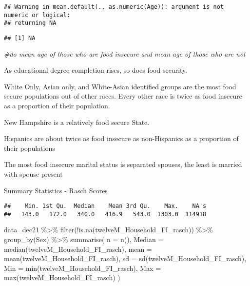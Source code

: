 \documentclass[
]{article}
\newenvironment{Shaded}{\begin{snugshade}}{\end{snugshade}}
\newcommand{\AttributeTok}[1]{\textcolor[rgb]{0.77,0.63,0.00}{#1}}
\newcommand{\CommentTok}[1]{\textcolor[rgb]{0.56,0.35,0.01}{\textit{#1}}}
\newcommand{\FunctionTok}[1]{\textcolor[rgb]{0.00,0.00,0.00}{#1}}
\newcommand{\NormalTok}[1]{#1}
\newcommand{\SpecialCharTok}[1]{\textcolor[rgb]{0.00,0.00,0.00}{#1}}
\begin{document}
\begin{verbatim}
## Warning in mean.default(., as.numeric(Age)): argument is not numeric or logical:
## returning NA
\end{verbatim}

\begin{verbatim}
## [1] NA
\end{verbatim}

\begin{Shaded}
\begin{Highlighting}[]
\CommentTok{\#do mean age of those who are food insecure and mean age of those who are not}
\end{Highlighting}
\end{Shaded}

As educational degree completion rises, so does food security.

White Only, Asian only, and White-Asian identified groups are the most
food secure populations out of other races. Every other race is twice as
food insecure as a proportion of their population.

New Hampshire is a relatively food secure State.

Hispanics are about twice as food insecure as non-Hispanics as a
proportion of their populations

The most food insecure marital status is separated spouses, the least is
married with spouse present

Summary Statistics - Rasch Scores

\begin{Shaded}
\end{Shaded}

\begin{verbatim}
##    Min. 1st Qu.  Median    Mean 3rd Qu.    Max.    NA's 
##   143.0   172.0   340.0   416.9   543.0  1303.0  114918
\end{verbatim}

\begin{Shaded}
\begin{Highlighting}[]
\NormalTok{data\_dec21 }\SpecialCharTok{\%\textgreater{}\%} \FunctionTok{filter}\NormalTok{(}\SpecialCharTok{!}\FunctionTok{is.na}\NormalTok{(twelveM\_Household\_FI\_rasch)) }\SpecialCharTok{\%\textgreater{}\%} 
\FunctionTok{group\_by}\NormalTok{(Sex) }\SpecialCharTok{\%\textgreater{}\%}
  \FunctionTok{summarise}\NormalTok{(}
    \AttributeTok{n =} \FunctionTok{n}\NormalTok{(),}
    \AttributeTok{Median =} \FunctionTok{median}\NormalTok{(twelveM\_Household\_FI\_rasch),}
    \AttributeTok{mean =} \FunctionTok{mean}\NormalTok{(twelveM\_Household\_FI\_rasch),}
    \AttributeTok{sd =} \FunctionTok{sd}\NormalTok{(twelveM\_Household\_FI\_rasch),}
    \AttributeTok{Min =} \FunctionTok{min}\NormalTok{(twelveM\_Household\_FI\_rasch),}
    \AttributeTok{Max =} \FunctionTok{max}\NormalTok{(twelveM\_Household\_FI\_rasch)}
\NormalTok{  )}
\end{Highlighting}
\end{Shaded}
\end{document}
